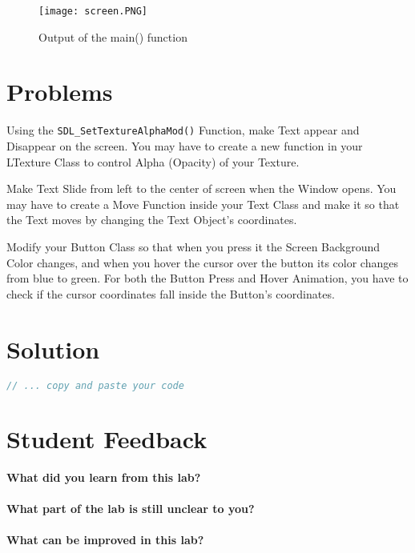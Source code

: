 \documentclass[11pt,fleqn]{book} %
\begin{document}
\begin{figure}[h]
  \centering
  \texttt{[image: screen.PNG]}
  \caption{Output of the main() function}
\end{figure}

\newpage
\section{Problems}

\begin{problem} Using the \texttt{SDL\_SetTextureAlphaMod()} Function, make Text appear and Disappear on the screen. You may have to create a new function in your LTexture Class to control Alpha (Opacity) of your Texture.\\
\end{problem}
\begin{problem} Make Text Slide from left to the center of screen when the Window opens. You may have to create a Move Function inside your Text Class and make it so that the Text moves by changing the Text Object's coordinates.\\
\end{problem}
\begin{problem} Modify your Button Class so that when you press it the Screen Background Color changes, and when you hover the cursor over the button its color changes from blue to green. For both the Button Press and Hover Animation, you have to check if the cursor coordinates fall inside the Button's coordinates.
\end{problem}

\newpage
\section{Solution}
\begin{lstlisting}[language=C++]
  // ... copy and paste your code
\end{lstlisting}

\newpage
\section{Student Feedback}
\textbf{What did you learn from this lab?}\\
\noindent\fbox{\parbox{\textwidth}{
  }
}\\
\textbf{What part of the lab is still unclear to you?}\\
\noindent\fbox{\parbox{\textwidth}{
  }
}\\
\textbf{What can be improved in this lab?}\\ 
\noindent\fbox{\parbox{\textwidth}{
  }
}
\end{document}

